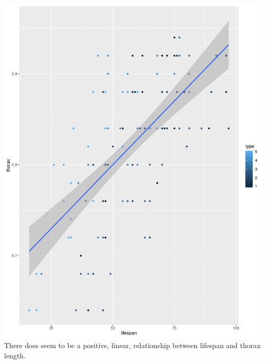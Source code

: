 \documentclass[12pt,letterpaper]{article}
\begin{document}
\begin{enumerate}
	\includegraphics{plot3-2}
	There does seem to be a positive, linear, relationship between lifespan and thorax length. 
	
	

\end{enumerate}
\end{document}

